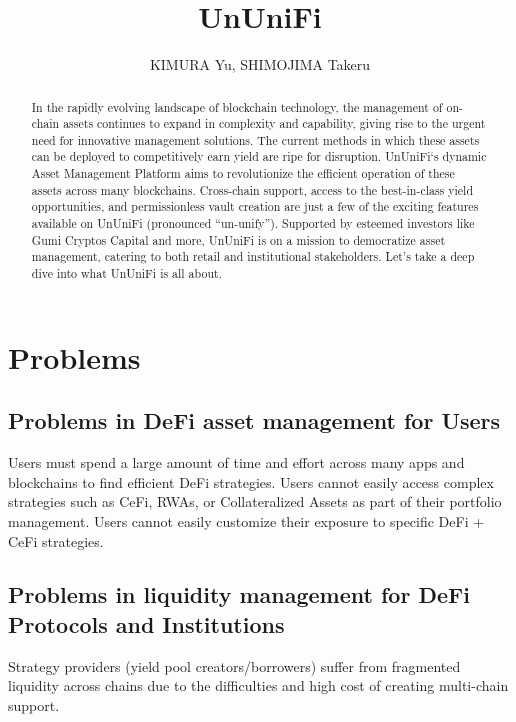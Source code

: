 \documentclass[dvipdfmx]{jsarticle}
\title{UnUniFi}
\author{KIMURA Yu, SHIMOJIMA Takeru}
\begin{document}

\maketitle

\begin{abstract}
In the rapidly evolving landscape of blockchain technology, the management of on-chain assets continues to expand in complexity and capability, giving rise to the urgent need for innovative management solutions. The current methods in which these assets can be deployed to competitively earn yield are ripe for disruption. UnUniFi‘s dynamic Asset Management Platform aims to revolutionize the efficient operation of these assets across many blockchains. Cross-chain support, access to the best-in-class yield opportunities, and permissionless vault creation are just a few of the exciting features available on UnUniFi (pronounced “un-unify”). Supported by esteemed investors like Gumi Cryptos Capital and more, UnUniFi is on a mission to democratize asset management, catering to both retail and institutional stakeholders. Let’s take a deep dive into what UnUniFi is all about.
\end{abstract}

\section{Problems}

\subsection{Problems in DeFi asset management for Users}
Users must spend a large amount of time and effort across many apps and blockchains to find efficient DeFi strategies. Users cannot easily access complex strategies such as CeFi, RWAs, or Collateralized Assets as part of their portfolio management. Users cannot easily customize their exposure to specific DeFi + CeFi strategies.

\subsection{Problems in liquidity management for DeFi Protocols and Institutions}
Strategy providers (yield pool creators/borrowers) suffer from fragmented liquidity across chains due to the difficulties and high cost of creating multi-chain support.
\end{document}
